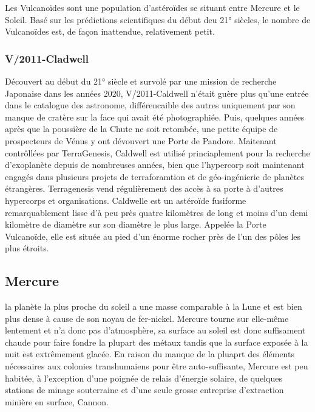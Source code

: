 Les Vulcanoïdes sont une population d'astéroïdes se situant entre Mercure et le Soleil. Basé sur les prédictions scientifiques du début deu 21° siècles, le nombre de Vulcanoïdes est, de façon inattendue, relativement petit. 

\subsubsection{V/2011-Cladwell} \label{sec:v2011-caldw} 

Découvert au début du 21° siècle et survolé par une mission de recherche Japonaise dans les années 2020, V/2011-Caldwell n'était guère plus qu'une entrée dans le catalogue des astronome, différencaible des autres uniquement par son manque de cratère sur la face qui avait été photographiée. Puis, quelques années après que la poussière de la Chute ne soit retombée, une petite équipe de prospecteurs de Vénus y ont dévouvert une Porte de Pandore. Maitenant contrôllées par TerraGenesis, Caldwell est utilisé princiaplement pour la recherche d'exoplanète depuis de nombreuses années, bien que l'hypercorp soit maintenant engagés dans plusieurs projets de terraforamtion et de géo-ingénierie de planètes étrangères. Terragenesis vend régulièrement des accès à sa porte à d'autres hypercorps et organisations. Caldwelle est un astéroïde fusiforme remarquablement lisse d'à peu près quatre kilomètres de long et moins d'un demi kilomètre de diamètre sur son diamètre le plus large. Appelée la Porte Vulcanoïde, elle est située au pied d'un énorme rocher près de l'un des pôles les plus étroits. 

\subsection{Mercure} \label{sec:mercury} 

la planète la plus proche du soleil a une masse comparable à la Lune et est bien plus dense à cause de son noyau de fer-nickel. Mercure tourne sur elle-même lentement et n'a donc pas d'atmosphère, sa surface au soleil est donc suffisament chaude pour faire fondre la plupart des métaux tandis que la surface exposée à la nuit est extrêmement glacée. En raison du manque de la pluaprt des éléments nécessaires aux colonies transhumaiens pour être auto-suffisante, Mercure est peu habitée, à l'exception d'une poignée de relais d'énergie solaire, de quelques stations de minage souterraine et d'une seule grosse entreprise d'extraction minière en surface, Cannon. 

